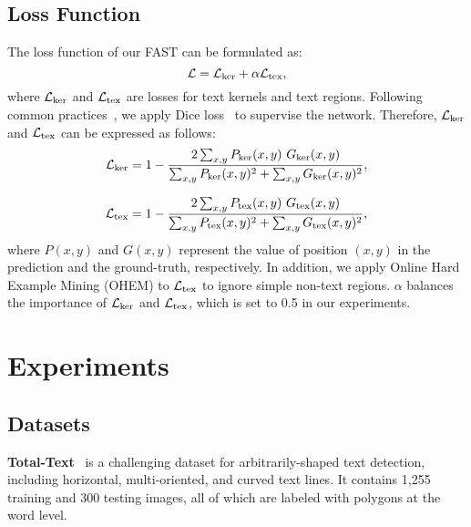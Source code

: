\documentclass[lettersize,journal]{IEEEtran}
\begin{document}
\subsection{Loss Function}

The loss function of our FAST can be formulated as:
\begin{equation}
	\mathcal{L}=\mathcal{L}_{\rm ker} + \alpha\mathcal{L}_{\rm tex},
	\label{total_loss}
\end{equation}
where $\mathcal{L}_{\rm ker}$ and $\mathcal{L}_{\rm tex}$ are losses for text kernels and text regions.
Following common practices~\cite{wang2019shape,wang2019efficient},
we apply Dice loss~\cite{milletari2016fully} to supervise the network. Therefore, $\mathcal{L}_{\rm ker}$ and $\mathcal{L}_{\rm tex}$ can be expressed as follows:
\begin{equation}
	\mathcal{L}_{\rm ker}=1-\frac{2\sum_{x,y}P_{\rm ker}(x,y)~G_{\rm ker}(x,y)}{\sum_{x,y}P_{\rm ker}(x,y)^2+\sum_{x,y}G_{\rm ker}(x,y)^2},
	\label{kernel_dice_loss}
\end{equation}

\begin{equation}
	\mathcal{L}_{\rm tex}=1-\frac{2\sum_{x,y}P_{\rm tex}(x,y)~G_{\rm tex}(x,y)}{\sum_{x,y}P_{\rm tex}(x,y)^2+\sum_{x,y}G_{\rm tex}(x,y)^2},
	\label{text_dice_loss}
\end{equation}
where $P(x,y)$ and $G(x,y)$ represent the value of position $(x,y)$ in the prediction and the ground-truth, respectively. 
In addition, we apply Online Hard Example Mining (OHEM) \cite{shrivastava2016training} to $\mathcal{L}_{\rm tex}$ to ignore simple non-text regions.
$\alpha$ balances the importance of $\mathcal{L}_{\rm ker}$ and $\mathcal{L}_{\rm tex}$, which is set to 0.5 in our experiments.



\section{Experiments}

\subsection{Datasets}

\noindent \textbf{Total-Text}~\cite{ch2017total} is a challenging dataset for arbitrarily-shaped text detection, including horizontal, multi-oriented, and curved text lines. 
It contains 1,255 training and 300 testing images, all of which are labeled with polygons at the word level.
\end{document}
